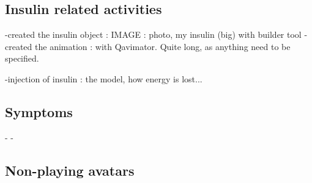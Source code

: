 \subsection{Insulin related activities}
-created the insulin object : IMAGE : photo, my insulin (big) with builder tool
-created the animation : with Qavimator. Quite long, as anything need to be specified.

-injection of insulin : the model, how energy is lost...



\subsection{Symptoms}
- 
-

\subsection{Non-playing avatars}

